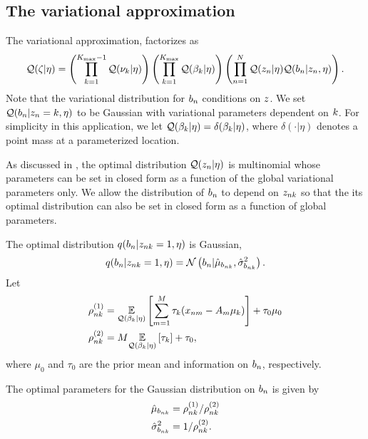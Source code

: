 \subsection{The variational approximation}
The variational approximation, factorizes as
\begin{align*}
\mathcal{Q}(\zeta \vert \eta) =
    \left( \prod_{k=1}^{{K_{\mathrm{max}}} - 1} \mathcal{Q}(\nu_{k} \vert \eta) \right)
    \left( \prod_{k=1}^{{K_{\mathrm{max}}}} \mathcal{Q}(\beta_k \vert \eta) \right)
    \left( \prod_{n=1}^{N} \mathcal{Q}(z_{n} \vert \eta)
    \mathcal{Q}(b_{n} \vert z_{n}, \eta)\right).
\end{align*}
Note that the variational distribution for $b_n$ conditions on $z$.
We set $\mathcal{Q}(b_{n} \vert z_{n} = k, \eta)$ to be Gaussian
with variational parameters dependent on $k$.
For simplicity in this application,
we let $\mathcal{Q}(\beta_k \vert \eta) = \delta (\beta_k \vert \eta)$,
where $\delta(\cdot \vert \eta)$ denotes a point mass at a parameterized location.

As discussed in ,
the optimal distribution $\mathcal{Q}(z_n\vert\eta)$ is multinomial whose parameters
can be set in closed form as a function of the global variational parameters only.
We allow the distribution of $b_n$ to depend on $z_{nk}$ so that
the its optimal distribution can also be set in closed form as a function of
global parameters.

The optimal distribution $q(b_n\vert z_{nk} = 1, \eta)$ is Gaussian,
\begin{align*}
q(b_n\vert z_{nk} = 1, \eta) = \mathcal{N}\left(b_n \vert \hat\mu_{b_{nk}}, \hat\sigma^2_{b_{nk}}\right).
\end{align*}
Let
\begin{align*}
  \rho^{(1)}_{nk} &= \underset{\mathcal{Q}(\beta_k|\eta)}{\mathbb{E}}\left[\sum_{m=1}^M \tau_{k}(x_{nm} - A_m\mu_k)\right] +
  \tau_0 \mu_0 \\
  \rho^{(2)}_{nk} &= M \underset{\mathcal{Q}(\beta_k|\eta)}{\mathbb{E}}\left[\tau_{k}\right] + \tau_0,
\end{align*}
where $\mu_0$ and $\tau_0$ are the prior mean and information on $b_n$, respectively.

The optimal parameters for the Gaussian distribution on $b_n$ is given by
\begin{align*}
  \hat\mu_{b_{nk}} &= \rho^{(1)}_{nk} / \rho^{(2)}_{nk}\\
  \hat\sigma^2_{b_{nk}} &= 1 / \rho^{(2)}_{nk}.
\end{align*}

